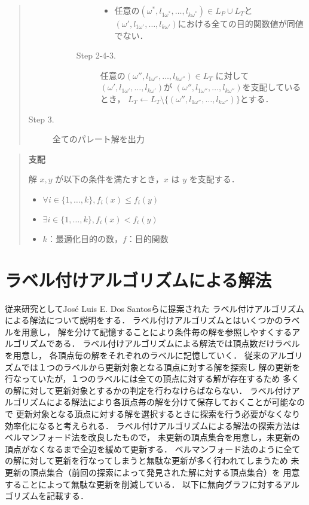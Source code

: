 \documentclass[12pt]{optlab-bachelor}
\begin{document}
\begin{quote}
\begin{description}
\begin{description}
\begin{description}
\begin{itemize}
          \item 任意の$(\omega^*,l_{1\omega^*},\ldots,l_{k\omega^*}) \in L_P \cup L_T$と
          $(\omega',l_{1\omega'},\ldots,l_{k\omega'})$における全ての目的関数値が同値でない．
        \end{itemize}
        \item[Step 2-4-3.] 任意の$(\omega'',l_{1\omega''},\ldots,l_{k\omega''})\in L_T$
        に対して$(\omega',l_{1\omega'},\ldots,l_{k\omega'})$が
        $(\omega'',l_{1\omega''},\ldots,l_{k\omega''})$を支配しているとき，
        $L_T \leftarrow L_T \setminus \{(\omega'',l_{1\omega''},\ldots,l_{k\omega''})\}$とする．
      \end{description}
    \end{description}
    \item[Step 3.] 全てのパレート解を出力
  \end{description}
\end{quote}

\begin{quote}
  \textbf{支配}

    解 $x,y$ が以下の条件を満たすとき，$x$ は $y$ を支配する．
    \begin{itemize}
      \item $\forall i \in \{1,\ldots,k\},f_i(x) \le f_i(y)$
      \item $\exists i \in \{1,\ldots,k\},f_i(x) < f_i(y)$
      \item $k$：最適化目的の数，$f$：目的関数
    \end{itemize}
\end{quote}

\section{ラベル付けアルゴリズムによる解法}
従来研究としてJosé Luis E. Dos Santosら\cite{Santos}に提案された
ラベル付けアルゴリズムによる解法について説明をする．
ラベル付けアルゴリズムとはいくつかのラベルを用意し，
解を分けて記憶することにより条件毎の解を参照しやすくするアルゴリズムである．
ラベル付けアルゴリズムによる解法では頂点数だけラベルを用意し，
各頂点毎の解をそれぞれのラベルに記憶していく．
従来のアルゴリズムでは１つのラベルから更新対象となる頂点に対する解を探索し
解の更新を行なっていたが，１つのラベルには全ての頂点に対する解が存在するため
多くの解に対して更新対象とするかの判定を行わなけらばならない．
ラベル付けアルゴリズムによる解法により各頂点毎の解を分けて保存しておくことが可能なので
更新対象となる頂点に対する解を選択するときに探索を行う必要がなくなり効率化になると考えられる．
ラベル付けアルゴリズムによる解法の探索方法はベルマンフォード法を改良したもので，
未更新の頂点集合を用意し，未更新の頂点がなくなるまで全辺を緩めて更新する．
ベルマンフォード法のように全ての解に対して更新を行なってしまうと無駄な更新が多く行われてしまうため
未更新の頂点集合（前回の探索によって発見された解に対する頂点集合）を
用意することによって無駄な更新を削減している．
以下に無向グラフに対するアルゴリズムを記載する．
\end{document}
